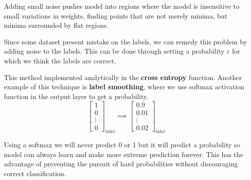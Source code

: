 Adding small noise pushes model into regions where the model is insensitive to
small variations in weights, finding points that are not merely minima, but
minima surrounded by flat regions.

Since some dataset present mistake on the labels, we can remedy this problem by
adding noise to the labels. This can be done through setting a probability $\varepsilon$
for which we think the labels are correct.

This method implemented analytically in the \textbf{cross entropy} function.
Another example of this technique is \textbf{label smoothing}, where we use
softmax activation function in the output layer to get a probability.
\begin{equation*}
    \left[\begin{array}{c}
            1 \\0\\\vdots\\ 0
        \end{array}\right]_{label} \implies \left[\begin{array}{c}
            0.9 \\0.01\\\vdots\\ 0.02
        \end{array}\right]_{label}
\end{equation*}

Using a softmax we will never predict 0 or 1 but it will predict a probability so
model can always learn and make more extreme prediction forever. This has the
advantage of preventing the pursuit of hard probabilities without discouraging
correct classification.
